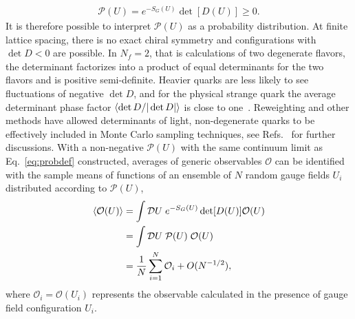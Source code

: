 \begin{equation}
  \begin{split}
    \mathcal{P}(U) = e^{-S_G(U)}\det[D(U)] \geq 0.
  \end{split}\label{eq:probdef}
\end{equation}
It is therefore possible to interpret $\mathcal{P}(U)$ as a probability distribution.
At finite lattice spacing, there is no exact chiral symmetry and configurations with $\det D < 0$ are possible.
In $N_f = 2$, that is calculations of two degenerate flavors, the determinant factorizes into a product of equal determinants for the two flavors and is positive semi-definite.
Heavier quarks are less likely to see fluctuations of negative $\det D$, and for the physical strange quark the average determinant phase factor $\left< \det D/|\det D| \right>$ is close to one~\cite{Beane:2010em}.
Reweighting and other methods have allowed determinants of light, non-degenerate quarks to be effectively included in Monte Carlo sampling techniques, see Refs.~\cite{Hasenfratz:2008fg,Finkenrath:2013soa} for further discussions.
With a non-negative $\mathcal{P}(U)$ with the same continuum limit as Eq.~\eqref{eq:probdef} constructed, averages of generic observables $\mathcal{O}$ can be identified with the sample means of functions of an ensemble of $N$ random gauge fields $U_i$ distributed according to $\mathcal{P}(U)$,
\begin{equation}
  \begin{split}
    \left< \mathcal{O}(U) \right> &= \int \mathcal{D}U \;e^{-S_G(U)}\det[D(U)]\mathcal{O}(U) \\
    &= \int \mathcal{D}U \;\mathcal{P}(U)\;\mathcal{O}(U) \\
    & = \frac{1}{N}\sum_{i=1}^N \mathcal{O}_i + O(N^{-1/2}),
  \end{split}\label{eq:MC}
\end{equation}
where $\mathcal{O}_i = \mathcal{O}(U_i)$ represents the observable calculated in the presence of gauge field configuration $U_i$.


